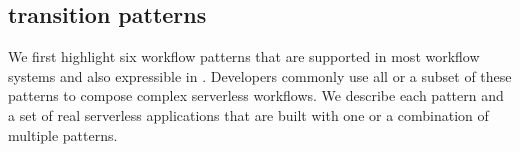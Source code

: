 \subsection{ transition patterns}
\label{sec:transition-patterns}

We first highlight six workflow patterns that are supported in most workflow
systems and also expressible in \name{}. Developers commonly use all or a
subset of these patterns to compose complex serverless workflows. We describe
each pattern and a set of real serverless applications that are built with one
or a combination of multiple patterns.



